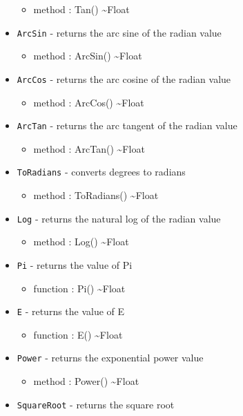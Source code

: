 \documentclass[11pt]{article}
\begin{document}
\begin{itemize}
\begin{itemize}
  \item method : Tan() \textasciitilde Float
  \end{itemize}
\item \texttt{ArcSin} - returns the arc sine of the radian value
  \begin{itemize}
  \item method : ArcSin() \textasciitilde Float
  \end{itemize}
\item \texttt{ArcCos} - returns the arc cosine of the radian value
  \begin{itemize}
  \item method : ArcCos() \textasciitilde Float
  \end{itemize}
\item \texttt{ArcTan} - returns the arc tangent of the radian value
  \begin{itemize}
  \item method : ArcTan() \textasciitilde Float
  \end{itemize}
\item \texttt{ToRadians} - converts degrees to radians
   \begin{itemize}
  \item method : ToRadians() \textasciitilde Float
  \end{itemize}
\item \texttt{Log} - returns the natural log of the radian value
  \begin{itemize}
  \item method : Log() \textasciitilde Float
  \end{itemize}
\item \texttt{Pi} - returns the value of Pi
  \begin{itemize}
  \item function : Pi() \textasciitilde Float
  \end{itemize}
\item \texttt{E} - returns the value of E
  \begin{itemize}
  \item function : E() \textasciitilde Float
  \end{itemize}
\item \texttt{Power} - returns the exponential power value
  \begin{itemize}
  \item method : Power() \textasciitilde Float
  \end{itemize}
\item \texttt{SquareRoot} - returns the square root

\end{itemize}
\end{document}
